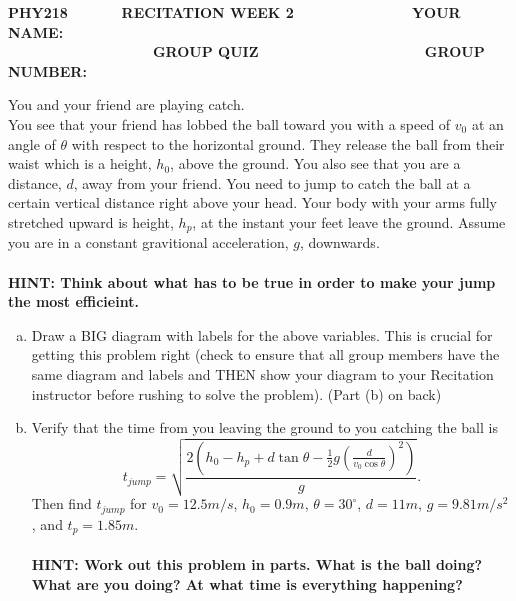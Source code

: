 \documentclass[11pt]{article}
\begin{document}
\bf{PHY218} \ \ \ \ \ \ \bf{RECITATION WEEK 2} \ \ \ \ \ \ \ \ \ \ \ \ \ \ \bf{YOUR NAME:}
\\

\ \ \ \ \ \ \ \ \ \ \ \ \ \ \ \ \ \ \bf{GROUP QUIZ} \ \ \ \ \ \ \ \ \ \ \ \ \ \ \ \ \ \ \ \ \bf{GROUP NUMBER:}

\noindent\makebox[\linewidth]{\rule{\paperwidth}{0.4pt}}


You and your friend are playing catch.
\\
	
You see that your friend has lobbed the ball toward you with a speed of $v_0$ at an angle of 
$\theta$ with respect to the horizontal ground. They release the ball from their waist which 
is a height, $h_0$, above the ground. You also see that you are a distance, $d$, away from 
your friend. You need to jump to catch the ball at a certain vertical distance right above 
your head. Your body with your arms fully stretched upward is height, $h_p$, at the 
instant your feet leave the ground. Assume you are in a constant gravitional acceleration, 
$g$, downwards.
\\
\\

\bf{HINT:} Think about what has to be true in order to make your jump the most efficieint.

\begin{enumerate}[(a)]
\item Draw a BIG diagram with labels for the above variables. This is crucial for getting 
this problem right (check to ensure that all group members have the same diagram and labels 
and THEN show your diagram to your Recitation instructor before rushing to solve the problem).  
(Part (b) on back)
\pagebreak

\item Verify that the time from you leaving the ground to you catching the ball is
$$t_{jump} = \sqrt{\frac{2\left(h_0-h_p+d\tan\theta-\frac{1}{2}g\left(\frac{d}{v_0\cos\theta}\right)^2\right)}{g}}.$$
Then find $t_{jump}$ for $v_0 = 12.5\unit{m/s}$, $h_0 = 0.9\unit{m}$, $\theta=30^{\circ}$,
$d=11\unit{m}$, $g=9.81\unit{m/s^2}$, and $t_p = 1.85\unit{m}$.\\
\\

\bf{HINT:} Work out this problem in parts. What is the ball doing? What are you doing? At 
what time is everything happening?
\end{enumerate}
\end{document}
